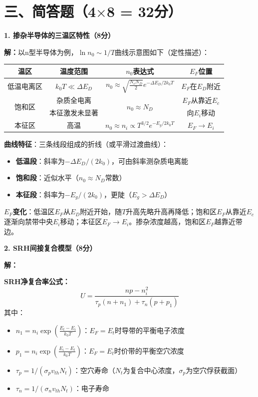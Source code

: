 \documentclass[12pt,a4paper]{ctexart}
\begin{document}
\newpage

\section*{三、简答题（4$\times$8 = 32分）}

\noindent\textbf{1. 掺杂半导体的三温区特性（8分）}

\textbf{解：}\quad 以n型半导体为例，$\ln n_0 \sim 1/T$曲线示意图如下（定性描述）：

\begin{center}
\begin{tabular}{c|c|c|c}
\toprule
温区 & 温度范围 & $n_0$表达式 & $E_F$位置 \\
\midrule
低温电离区 & $k_0T \ll \Delta E_D$ & $n_0 \approx \sqrt{\frac{N_c N_D}{2}}e^{-\Delta E_D/2k_0T}$ & $E_F$在$E_D$附近 \\
\multirow{2}{*}{饱和区} & 杂质全电离 & \multirow{2}{*}{$n_0 \approx N_D$} & $E_F$从靠近$E_c$ \\
& 本征激发未显著 & & 向$E_i$移动 \\
本征区 & 高温 & $n_0 \approx n_i \propto T^{3/2}e^{-E_g/2k_0T}$ & $E_F \to E_i$ \\
\bottomrule
\end{tabular}
\end{center}

\noindent\textbf{曲线特征}：三条线段组成的折线（或平滑过渡曲线）：
\begin{itemize}[nosep]
\item \textbf{低温段}：斜率为$-\Delta E_D/(2k_0)$，可由斜率测杂质电离能
\item \textbf{饱和段}：近似水平（$n_0 \approx N_D$常数）
\item \textbf{本征段}：斜率为$-E_g/(2k_0)$，更陡（$E_g > \Delta E_D$）
\end{itemize}

\noindent\textbf{$E_F$变化}：低温区$E_F$从$E_D$附近开始，随$T$升高先略升高再降低；饱和区$E_F$从靠近$E_c$逐渐向禁带中央$E_i$移动；本征区$E_F \to E_i$。掺杂浓度越高，饱和区$E_F$越靠近带边。

\vspace{1cm}

\noindent\textbf{2. SRH间接复合模型（8分）}

\textbf{解：}\quad

\textbf{SRH净复合率公式：}
\[
U = \frac{np - n_i^2}{\tau_p(n + n_1) + \tau_n(p + p_1)}
\]
其中：
\begin{itemize}[nosep]
\item $n_1 = n_i\exp(\frac{E_t - E_i}{k_0T})$：$E_F = E_t$时导带的平衡电子浓度
\item $p_1 = n_i\exp(\frac{E_i - E_t}{k_0T})$：$E_F = E_t$时价带的平衡空穴浓度
\item $\tau_p = 1/(\sigma_p v_{th} N_t)$：空穴寿命（$N_t$为复合中心浓度，$\sigma_p$为空穴俘获截面）
\item $\tau_n = 1/(\sigma_n v_{th} N_t)$：电子寿命
\end{itemize}
\end{document}
